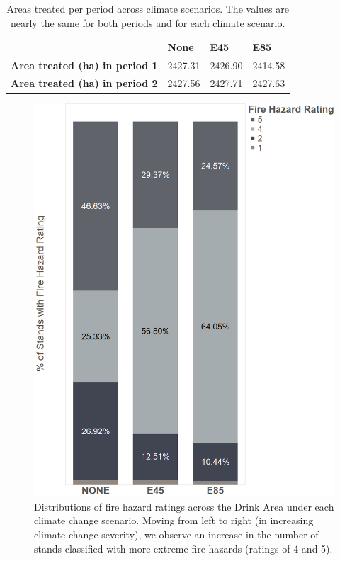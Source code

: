 \begin{table}[]
\centering
\caption[Area treated per period across climate scenarios]{Areas treated per period across climate scenarios. The values are nearly the same for both periods and for each climate scenario.}
\label{tab:treatedAreas}
\begin{tabular}{l|lll}
                                                                                                           & \textbf{None} & \textbf{E45} & \textbf{E85} \\ \hline
\textbf{Area treated (ha) in period 1} & 2427.31            & 2426.90 & 2414.58          \\
\textbf{Area treated (ha) in period 2}                     & 2427.56         & 2427.71        & 2427.63      
\end{tabular}
\end{table}

\begin{figure}[ht]
\centering
\includegraphics[width=.5\textwidth]{../images/FireHazardRatingsPerClimateScenario}
\caption[Distribution of fire hazard ratings over the Drink Area for each climate change scenario]{Distributions of fire hazard ratings across the Drink Area under each climate change scenario. Moving from left to right (in increasing climate change severity), we observe an increase in the number of stands classified with more extreme fire hazards (ratings of 4 and 5).}
\label{fig:distOfFireHazards}
\end{figure}

